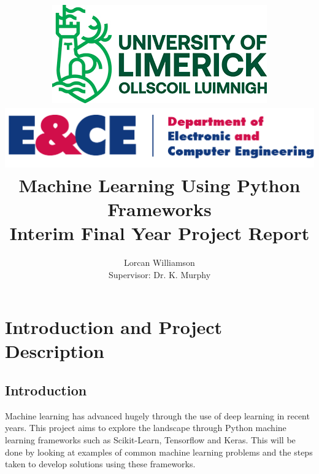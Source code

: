 \documentclass[12pt,a4paper,titlepage]{book}
\begin{document}
\title{
  \includegraphics[width=0.3\linewidth]{ul-logo.jpg}
  \hspace{1cm}
  \includegraphics[width=0.6\linewidth]{ECE_Logo.png}
  Machine Learning Using Python Frameworks\\ [2ex] 
  {\Large Interim Final Year Project Report}
}
\author{Lorcan Williamson\\Supervisor: Dr. K. Murphy}
\maketitle

\tableofcontents

\chapter{Introduction and Project Description}
\section{Introduction}
	Machine learning has advanced hugely through the use of deep learning in recent years. This project aims to explore the landscape through Python machine learning frameworks such as Scikit-Learn, Tensorflow and Keras. This will be done by looking at examples of common machine learning problems and the steps taken to develop solutions using these frameworks.
\end{document}
